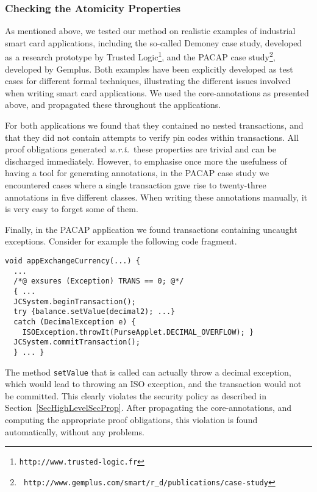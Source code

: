 \subsubsection{Checking the Atomicity Properties}


As mentioned above, we tested our method on realistic examples of
industrial smart card applications, including the so-called Demoney
case study, developed as a research prototype by Trusted
Logic\footnote{{\tt http://www.trusted-logic.fr}}, and the PACAP case
study\footnote{{\tt
http://www.gemplus.com/smart/r\_d/publications/case-study}}, developed
by Gemplus. Both examples have been explicitly developed as test cases
for different formal techniques, illustrating the different issues
involved when writing smart card applications. We used the
core-annotations as presented above, and propagated these throughout
the applications.

For both applications we found that they contained no nested
transactions, and that they did not contain attempts to verify pin
codes within transactions. All proof obligations generated
\emph{w.r.t.}~these properties are trivial and can be discharged
immediately. However, to emphasise once more the usefulness of having
a tool for generating annotations, in the PACAP case study we
encountered cases where a single transaction gave rise to twenty-three
annotations in five different classes. When writing these annotations
manually, it is very easy to forget some of them.

Finally, in the PACAP application we found transactions containing
uncaught exceptions. Consider for example the following code fragment.
\begin{verbatim}
void appExchangeCurrency(...) { 
  ...
  /*@ exsures (Exception) TRANS == 0; @*/ 
  { ...
  JCSystem.beginTransaction();      
  try {balance.setValue(decimal2); ...}
  catch (DecimalException e) {
    ISOException.throwIt(PurseApplet.DECIMAL_OVERFLOW); }
  JCSystem.commitTransaction();
  } ... }
\end{verbatim}
The method \texttt{setValue} that is called can actually throw a
decimal exception, which would lead to throwing an ISO exception, and
the transaction would not be committed. This clearly violates the
security policy as described in
Section~\ref{SecHighLevelSecProp}. After propagating the
core-annotations, and computing the appropriate proof obligations,
this violation is found automatically, without any problems.

